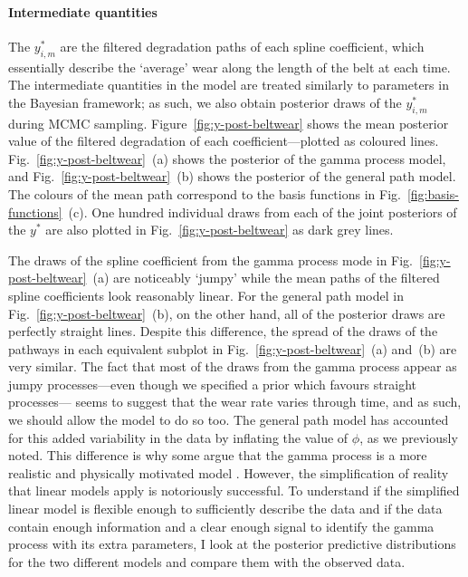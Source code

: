 \paragraph{Intermediate quantities}
The $y^*_{i, m}$ are the filtered degradation paths of each spline coefficient, which essentially describe the `average' wear along the length of the belt at each time. The intermediate quantities in the model are treated similarly to parameters in the Bayesian framework; as such, we also obtain posterior draws of the $y^*_{i, m}$ during MCMC sampling. Figure~\ref{fig:y-post-beltwear} shows the mean posterior value of the filtered degradation of each coefficient---plotted as coloured lines. Fig.~\ref{fig:y-post-beltwear}~(a) shows the posterior of the gamma process model, and Fig.~\ref{fig:y-post-beltwear}~(b) shows the posterior of the general path model. The colours of the mean path correspond to the basis functions in Fig.~\ref{fig:basis-functions}~(c). One hundred individual draws from each of the joint posteriors of the $y^*$ are also plotted in Fig.~\ref{fig:y-post-beltwear} as dark grey lines.

The draws of the spline coefficient from the gamma process mode in Fig.~\ref{fig:y-post-beltwear}~(a) are noticeably `jumpy' while the mean paths of the filtered spline coefficients look reasonably linear. For the general path model in Fig.~\ref{fig:y-post-beltwear}~(b), on the other hand, all of the posterior draws are perfectly straight lines. Despite this difference, the spread of the draws of the pathways in each equivalent subplot in Fig.~\ref{fig:y-post-beltwear}~(a) and~(b) are very similar. The fact that most of the draws from the gamma process appear as jumpy processes---even though we specified a prior which favours straight processes--- seems to suggest that the wear rate varies through time, and as such, we should allow the model to do so too. The general path model has accounted for this added variability in the data by inflating the value of $\phi$, as we previously noted. This difference is why some argue that the gamma process is a more realistic and physically motivated model \citep{ye2015}. However, the simplification of reality that linear models apply is notoriously successful. To understand if the simplified linear model is flexible enough to sufficiently describe the data and if the data contain enough information and a clear enough signal to identify the gamma process with its extra parameters, I look at the posterior predictive distributions for the two different models and compare them with the observed data.


